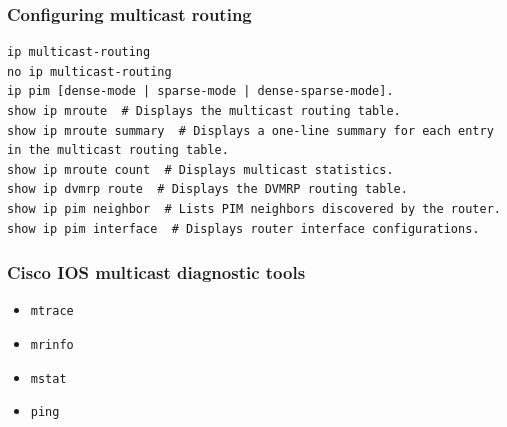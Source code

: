 \documentclass{../UTNetLab}
\begin{document}
\subsubsection{Configuring multicast routing}
\begin{lstlisting}[language={cisco}]
ip multicast-routing
no ip multicast-routing
ip pim [dense-mode | sparse-mode | dense-sparse-mode].
show ip mroute  # Displays the multicast routing table.
show ip mroute summary  # Displays a one-line summary for each entry in the multicast routing table.
show ip mroute count  # Displays multicast statistics.
show ip dvmrp route  # Displays the DVMRP routing table.
show ip pim neighbor  # Lists PIM neighbors discovered by the router.
show ip pim interface  # Displays router interface configurations.
\end{lstlisting}

\subsubsection{Cisco IOS multicast diagnostic tools}
\begin{itemize}
    \item \lstinline[language={cisco}]{mtrace}
    \item \lstinline[language={cisco}]{mrinfo}
    \item \lstinline[language={cisco}]{mstat}
    \item \lstinline[language={cisco}]{ping}
\end{itemize}
\end{document}
